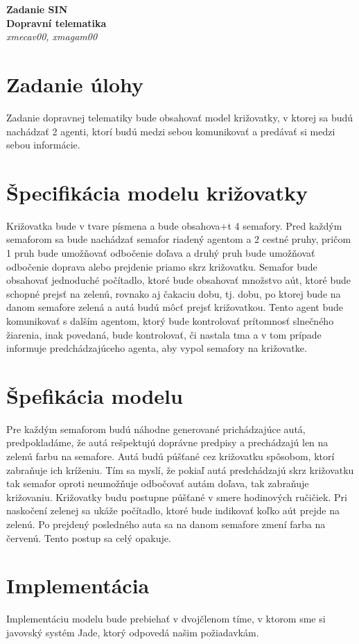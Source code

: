 \documentclass[12pt,a4paper,titlepage,final]{article}
\begin{document}
   \begin{center}
      \Large\textbf{Zadanie SIN}\\
      \Large\textbf{Dopravní telematika}\\
      \large\textit{xmecav00, xmagam00}
   \end{center}
  
\section{Zadanie úlohy}
Zadanie dopravnej telematiky bude obsahovať model križovatky, v ktorej sa budú nachádzať 2 agenti, ktorí budú medzi sebou komunikovať a predávať si medzi sebou informácie. 

\section{Špecifikácia modelu križovatky}
Križovatka bude v tvare písmena  a bude obsahova+t 4 semafory. Pred každým semaforom sa bude nachádzať semafor riadený agentom a 2 cestné pruhy, pričom 1 pruh bude umožňovať odbočenie doľava a druhý pruh bude umožňovať odbočenie doprava alebo prejdenie priamo skrz križovatku. Semafor bude obsahovať jednoduché počítadlo, ktoré bude obsahovať množstvo aút, ktoré bude schopné prejsť na zelenú, rovnako aj čakaciu dobu, tj. dobu, po ktorej bude na danom semafore zelená a autá budú môcť prejsť križovatkou. Tento agent bude komunikovať s dalším agentom, ktorý bude kontrolovať prítomnosť slnečného žiarenia, inak povedaná, bude kontrolovať, či nastala tma a v tom prípade informuje predchádzajúceho agenta, aby vypol semafory na križovatke. 
\section{Špefikácia modelu}
Pre každým semaforom budú náhodne generované prichádzajúce autá, predpokladáme, že autá rešpektujú doprávne predpisy a prechádzajú len na zelenú farbu na semafore. Autá budú púšťané cez križovatku spôsobom, ktorí zabraňuje ich kríženiu. Tím sa myslí, že pokiaľ autá predchádzajú skrz križovatku tak semafor oproti neumožňuje odbočovať autám doľava, tak zabraňuje križovaniu. Križovatky budu postupne púšťané v smere hodinových ručičiek. Pri naskočení zelenej sa ukáže počítadlo, ktoré bude indikovať koľko aút prejde na zelenú. Po prejdený posledného auta sa na danom semafore zmení farba na červenú. Tento postup sa celý opakuje.

\section{Implementácia}
Implementáciu modelu bude prebiehať v dvojčlenom tíme, v ktorom sme si javovský systém Jade, ktorý odpovedá našim požiadavkám.
\end{document}
